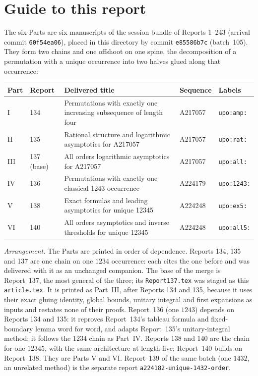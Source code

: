 \documentclass[11pt,letterpaper]{article}
\theoremstyle{remark}\newtheorem{remark}[theorem]{Remark}
\numberwithin{equation}{section}
\newcommand{\file}[1]{\nolinkurl{#1}}
\begin{document}
\section*{Guide to this report}\label{upo:sec:guide}
The six Parts are six manuscripts of the session bundle of Reports 1--243 (arrival commit \texttt{60f54ea06}), placed in this directory by commit \texttt{e85586b7c} (batch~105). They form two chains and one offshoot on one spine, the decomposition of a permutation with a unique occurrence into two halves glued along that occurrence:
\begin{center}
\small
\begin{tabular}{@{}l l >{\raggedright\arraybackslash}p{} l l@{}}
\toprule
Part & Report & Delivered title & Sequence & Labels\\
\midrule
I & 134 & Permutations with exactly one increasing subsequence of length four & A217057 & \texttt{upo:amp:}\\
II & 135 & Rational structure and logarithmic asymptotics for A217057 & A217057 & \texttt{upo:rat:}\\
III & 137 (base) & All orders logarithmic asymptotics for A217057 & A217057 & \texttt{upo:all:}\\
IV & 136 & Permutations with exactly one classical 1243 occurrence & A224179 & \texttt{upo:1243:}\\
V & 138 & Exact formulas and leading asymptotics for unique 12345 & A224248 & \texttt{upo:ex5:}\\
VI & 140 & All orders asymptotics and inverse thresholds for unique 12345 & A224248 & \texttt{upo:all5:}\\
\bottomrule
\end{tabular}
\end{center}
\emph{Arrangement.} The Parts are printed in order of dependence. Reports 134, 135 and 137 are one chain on one $1234$ occurrence: each cites the one before and was delivered with it as an unchanged companion. The base of the merge is Report~137, the most general of the three; its \file{Report137.tex} was staged as this \file{article.tex}. It is printed as Part~III, after Reports 134 and 135, because it uses their exact gluing identity, global bounds, unitary integral and first expansions as inputs and restates none of their proofs. Report~136 (one $1243$) depends on Reports 134 and 135: it reproves Report~134's tableau formula and fixed-boundary lemma word for word, and adapts Report~135's unitary-integral method; it follows the $1234$ chain as Part~IV. Reports 138 and 140 are the chain for one $12345$, with the same architecture at length five; Report~140 builds on Report~138. They are Parts V and VI. Report~139 of the same batch (one $1432$, an unrelated method) is the separate report \file{a224182-unique-1432-order}.
\end{document}
